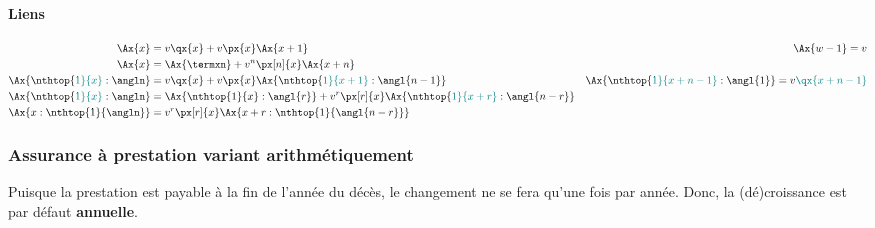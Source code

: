 \documentclass[10pt, french]{article}
\begin{document}
\begin{multicols*}{3}
\paragraph{Liens}
\begin{align*}
	\Ax{x} 
	&=	v \qx{x} + v \px{x} \Ax{x + 1} & \Ax{w - 1} 
	=	v \\
	\Ax{x} 
	&=	\Ax{\termxn} + v^n \px[n]{x} \Ax{x + n} \\
	\Ax{\nthtop{\color{teal}1}{x}:\angln} 
	&=	v \qx{x} + v \px{x} \Ax{\nthtop{\color{teal}1}{x + 1}:\angl{n-1}} & \Ax{\nthtop{\color{teal}1}{x + n - 1}:\angl{1}} = v {\color{teal}\qx{x + n - 1}} \\
	\Ax{\nthtop{\color{teal}1}{x}:\angln} 
	&=	\Ax{\nthtop{1}{x}:\angl{r}} + v^r \px[r]{x} \Ax{\nthtop{\color{teal}1}{x + r}:\angl{n - r}} \\
	\Ax{x:\nthtop{1}{\angln}} 
	&=	v^r \px[r]{x} \Ax{{x + r}:\nthtop{1}{\angl{n - r}}}
\end{align*}




\columnbreak
\subsubsection*{\textcolor{amber(sae/ece)}{Assurance à prestation variant arithmétiquement}}
\begin{rappel_enhanced}[Contexte]
Puisque la prestation est payable à la fin de l'année du décès, le changement ne se fera qu'une fois par année. Donc, la (dé)croissance est par défaut \textbf{annuelle}.
\end{rappel_enhanced}



\end{multicols*}
\end{document}

